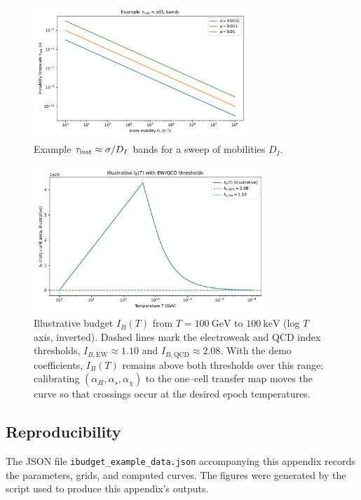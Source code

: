\documentclass[11pt]{article}
\theoremstyle{plain}
\theoremstyle{definition}
\begin{document}
\begin{figure}[h]
  \centering
  \includegraphics[width=0.72\textwidth]{inst_timescale_sweep.pdf}
  \caption{Example $\tau_{\rm inst}\approx \sigma/D_I$ bands for a sweep of mobilities $D_I$.}
  \label{fig:tauinst}
\end{figure}

\begin{figure}[h]
  \centering
  \includegraphics[width=0.78\textwidth]{ibudget_vs_temperature.pdf}
  \caption{Illustrative budget $I_B(T)$ from $T=100~\mathrm{GeV}$ to $100~\mathrm{keV}$ (log $T$ axis, inverted).
    Dashed lines mark the electroweak and QCD index thresholds,
    $I_{B,\mathrm{EW}}\approx 1.10$ and $I_{B,\mathrm{QCD}}\approx 2.08$.
    With the demo coefficients, $I_B(T)$ remains above both thresholds over this range;
    calibrating $(\alpha_H,\alpha_s,\alpha_\chi)$ to the one–cell transfer map moves the
  curve so that crossings occur at the desired epoch temperatures.}
  \label{fig:ibudget_vs_T}
\end{figure}

\subsection{Reproducibility}
The JSON file \texttt{ibudget_example_data.json} accompanying this appendix records the parameters, grids, and computed curves. The figures were generated by the script used to produce this appendix’s outputs.
\end{document}
